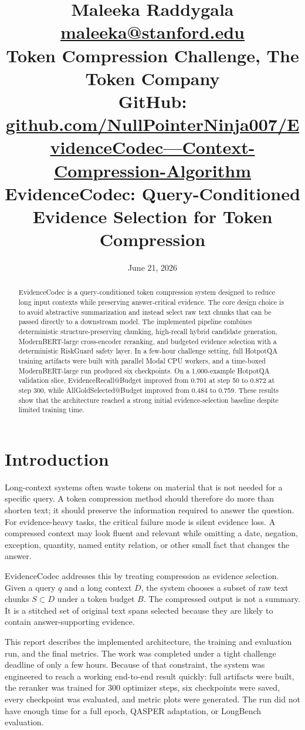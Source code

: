 \documentclass[10pt,twocolumn]{article}
\title{\vspace{-0.45in}
\normalsize Maleeka Raddygala\\
\small \href{mailto:maleeka@stanford.edu}{maleeka@stanford.edu}\\
\small Token Compression Challenge, The Token Company\\
\small GitHub: \href{https://github.com/NullPointerNinja007/EvidenceCodec---Context-Compression-Algorithm}{github.com/NullPointerNinja007/EvidenceCodec---Context-Compression-Algorithm}\\[0.12in]
\Large\textbf{EvidenceCodec: Query-Conditioned Evidence Selection for Token Compression}}
\author{}
\date{June 21, 2026}
\begin{document}
\maketitle

\begin{abstract}
EvidenceCodec is a query-conditioned token compression system designed to reduce long input contexts while preserving answer-critical evidence. The core design choice is to avoid abstractive summarization and instead select raw text chunks that can be passed directly to a downstream model. The implemented pipeline combines deterministic structure-preserving chunking, high-recall hybrid candidate generation, ModernBERT-large cross-encoder reranking, and budgeted evidence selection with a deterministic RiskGuard safety layer. In a few-hour challenge setting, full HotpotQA training artifacts were built with parallel Modal CPU workers, and a time-boxed ModernBERT-large run produced six checkpoints. On a 1,000-example HotpotQA validation slice, EvidenceRecall@Budget improved from 0.701 at step 50 to 0.872 at step 300, while AllGoldSelected@Budget improved from 0.484 to 0.759. These results show that the architecture reached a strong initial evidence-selection baseline despite limited training time.
\end{abstract}

\section{Introduction}
Long-context systems often waste tokens on material that is not needed for a specific query. A token compression method should therefore do more than shorten text; it should preserve the information required to answer the question. For evidence-heavy tasks, the critical failure mode is silent evidence loss. A compressed context may look fluent and relevant while omitting a date, negation, exception, quantity, named entity relation, or other small fact that changes the answer.

EvidenceCodec addresses this by treating compression as evidence selection. Given a query $q$ and a long context $D$, the system chooses a subset of raw text chunks $S \subset D$ under a token budget $B$. The compressed output is not a summary. It is a stitched set of original text spans selected because they are likely to contain answer-supporting evidence.

This report describes the implemented architecture, the training and evaluation run, and the final metrics. The work was completed under a tight challenge deadline of only a few hours. Because of that constraint, the system was engineered to reach a working end-to-end result quickly: full artifacts were built, the reranker was trained for 300 optimizer steps, six checkpoints were saved, every checkpoint was evaluated, and metric plots were generated. The run did not have enough time for a full epoch, QASPER adaptation, or LongBench evaluation.
\end{document}
